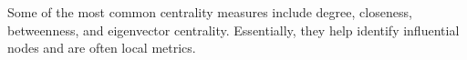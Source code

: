 \documentclass[preview]{standalone}
\begin{document}
Some of the most common centrality measures include degree, closeness, betweenness, and eigenvector centrality. Essentially, they help identify influential nodes and are often local metrics.\\
\end{document}
